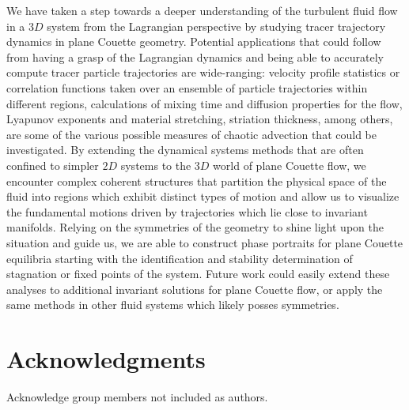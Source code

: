 \documentclass[letter,12pt,openany]{article}
\begin{document}
We have taken a step towards a deeper understanding of the  turbulent fluid flow in a $3D$ system from the Lagrangian perspective by studying tracer trajectory dynamics in plane Couette geometry.
Potential applications that could follow from having a grasp of the Lagrangian dynamics and being able to accurately compute tracer particle trajectories are wide-ranging: velocity profile statistics or correlation functions taken over an ensemble of particle trajectories within different regions, calculations of mixing time
and diffusion properties for the flow, Lyapunov exponents and material stretching,
striation thickness, among others, are some of the various possible measures of chaotic advection that could be investigated. By extending the dynamical systems methods that are often confined to simpler $2D$ systems to the $3D$ world of plane Couette flow, we encounter complex coherent structures that partition the physical space of the fluid into regions which exhibit distinct types of motion and allow us to visualize the fundamental motions driven by trajectories which lie close to invariant manifolds. Relying on the symmetries of the geometry to shine light upon the situation and guide us, we are able to construct phase portraits for plane Couette equilibria starting with the identification and stability determination of stagnation or fixed points of the system. Future work could easily extend these analyses to additional invariant solutions for plane Couette flow, or apply the same methods in other fluid systems which likely posses symmetries.


\section{\centering Acknowledgments}
Acknowledge group members not included as authors.









\end{document}
